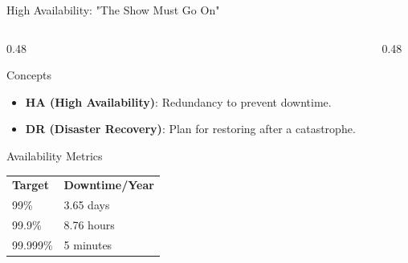 \documentclass[aspectratio=169]{beamer}  %
\begin{document}
\begin{frame}{High Availability: "The Show Must Go On"}
    \begin{columns}[T]
        \begin{column}{0.48\textwidth}
            \begin{block}{Concepts}
                \small
                \begin{itemize}
                    \item \textbf{HA (High Availability)}: Redundancy to prevent downtime.
                    \item \textbf{DR (Disaster Recovery)}: Plan for restoring after a catastrophe.
                \end{itemize}
            \end{block}
            \begin{block}{Availability Metrics}
                \footnotesize
                \begin{tabular}{l l}
                    \textbf{Target} & \textbf{Downtime/Year} \\
                    99\% & 3.65 days \\
                    99.9\% & 8.76 hours \\
                    99.999\% & 5 minutes \\
                \end{tabular}
            \end{block}
        \end{column}
        \begin{column}{0.48\textwidth}
            \begin{center}
            \end{center}
        \end{column}
    \end{columns}
\end{frame}
\end{document}
